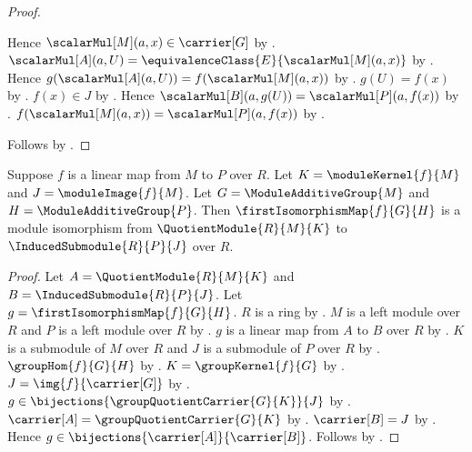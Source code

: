 \begin{proof}
\begin{subproof}
        Hence $\scalarMul[M](a,x)\in\carrier[G]$ by
            .
        $\scalarMul[A](a,U)=
            \equivalenceClass{E}{\scalarMul[M](a,x)}$ by
            .
        Hence $g(\scalarMul[A](a,U))
            =f(\scalarMul[M](a,x))$ by
            .
        $g(U)=f(x)$ by
            .
        $f(x)\in J$ by .
        Hence $\scalarMul[B](a,g(U))=\scalarMul[P](a,f(x))$ by
            .
        $f(\scalarMul[M](a,x))=\scalarMul[P](a,f(x))$ by
            .
    \end{subproof}
    Follows by .
\end{proof}


\begin{theorem}\label{module_first_isomorphism_theorem}
    Suppose $f$ is a linear map from $M$ to $P$ over $R$.
    Let $K=\moduleKernel{f}{M}$ and
        $J=\moduleImage{f}{M}$.
    Let $G=\ModuleAdditiveGroup{M}$ and
        $H=\ModuleAdditiveGroup{P}$.
    Then $\firstIsomorphismMap{f}{G}{H}$ is a module isomorphism from
        $\QuotientModule{R}{M}{K}$ to
        $\InducedSubmodule{R}{P}{J}$ over $R$.
\end{theorem}
\begin{proof}
    Let $A=\QuotientModule{R}{M}{K}$ and
        $B=\InducedSubmodule{R}{P}{J}$.
    Let $g=\firstIsomorphismMap{f}{G}{H}$.
    $R$ is a ring by .
    $M$ is a left module over $R$ and
        $P$ is a left module over $R$ by
        .
    $g$ is a linear map from $A$ to $B$ over $R$ by
        .
    $K$ is a submodule of $M$ over $R$ and
        $J$ is a submodule of $P$ over $R$ by
        .
    $\groupHom{f}{G}{H}$ by
        .
    $K=\groupKernel{f}{G}$ by .
    $J=\img{f}{\carrier[G]}$ by
        .
    $g\in\bijections{\groupQuotientCarrier{G}{K}}{J}$ by
        .
    $\carrier[A]=\groupQuotientCarrier{G}{K}$ by
        .
    $\carrier[B]=J$ by .
    Hence $g\in\bijections{\carrier[A]}{\carrier[B]}$.
    Follows by .
\end{proof}

